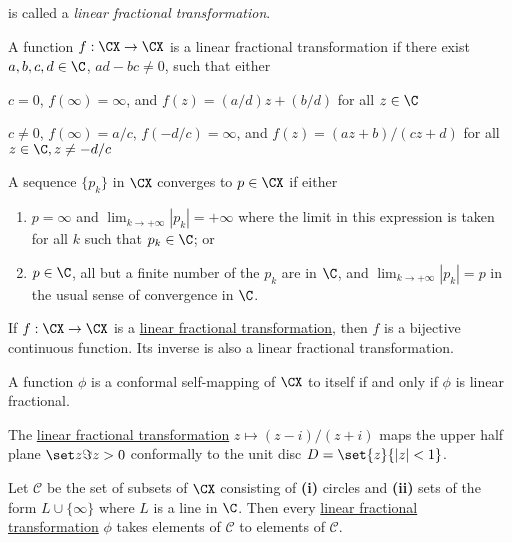 is called a \textit{linear fractional transformation}.

\label{f46e597}

A function $f:\CX\to\CX$ is a linear fractional transformation if there exist
$a,b,c,d\in\C$, $ad-bc\neq0$, such that either
\begin{enumerati}
  \item $c=0$, $f(\infty)=\infty$, and $f(z)=(a/d)z+(b/d)$ for all $z\in\C$
  \item $c\neq0$, $f(\infty)=a/c$, $f(-d/c)=\infty$, and $f(z)=(az+b)/(cz+d)$
  for all $z\in\C,z\neq-d/c$
\end{enumerati}

\label{a2b8117}

A sequence $\{p_k\}$ in $\CX$ converges to $p\in\CX$ if either
\begin{enumerate}
  \item $p=\infty$ and $\lim_{k\to+\infty}|p_k|=+\infty$ where the limit in this
        expression is taken for all $k$ such that $p_k\in\C$; or
  \item $p\in\C$, all but a finite number of the $p_k$ are in $\C$, and
        $\lim_{k\to+\infty}|p_k|=p$ in the usual sense of convergence in $\C$.
\end{enumerate}

\label{e521731}

If $f:\CX\to\CX$ is a \href{f46e597}{linear fractional transformation}, then
$f$ is a bijective continuous function. Its inverse is also a linear fractional
transformation.

\label{a7b9b92}

A function $\phi$ is a conformal self-mapping of $\CX$ to itself if and only if
$\phi$ is linear fractional.

\label{f17d4d9}

The \href{f46e597}{linear fractional transformation} $z\mapsto (z-i)/(z+i)$
maps the upper half plane $\set z{\Im z>0}$ conformally to the unit disc
$D=\set{z}{|z|<1}$.

\label{d07b1b4}

Let $\mathcal C$ be the set of subsets of $\CX$ consisting of \textbf{(i)}
circles and \textbf{(ii)} sets of the form $L\cup\{\infty\}$ where $L$ is a
line in $\C$. Then every \href{f46e597}{linear fractional transformation}
$\phi$ takes elements of $\mathcal C$ to elements of $\mathcal C$.


